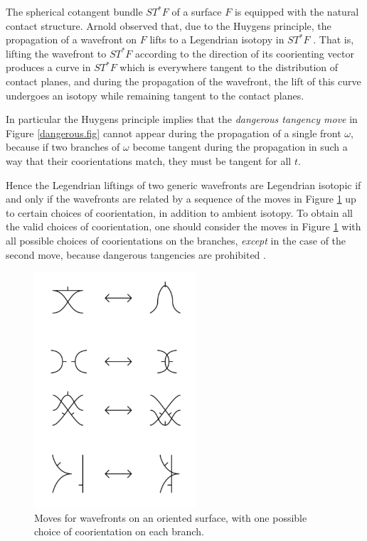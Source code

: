 The spherical cotangent bundle $ST^*F$ of a surface $F$ is equipped with the natural contact structure.  Arnold observed that, due to the Huygens principle, the propagation of a wavefront on $F$ lifts to a Legendrian isotopy in $ST^*F$ \cite{ArnoldMechanics, ArnoldPDE}.  That is, lifting the wavefront to $ST^*F$ according to the direction of its coorienting vector produces a curve in $ST^*F$ which is everywhere tangent to the distribution of contact planes, and during the propagation of the wavefront, the lift of this curve undergoes an isotopy while remaining tangent to the contact planes.  

In particular the Huygens principle implies that the {\it dangerous tangency move} in Figure \ref{dangerous.fig} cannot appear during the propagation of a single front $\omega$, because if two branches of $\omega$ become tangent during the propagation in such a way that their coorientations match, they must be tangent for all $t$.


Hence the Legendrian liftings of two generic wavefronts are Legendrian isotopic if and only if the wavefronts are related by a sequence of the moves in Figure \ref{wavefrontmoves.fig} up to certain choices of coorientation, in addition to ambient isotopy.  To obtain all the valid choices of coorientation, one should consider the moves in Figure \ref{wavefrontmoves.fig} with all possible choices of coorientations on the branches, {\it except} in the case of the second move, because dangerous tangencies are prohibited \cite{ArnoldInvariants}.



\begin{figure}[htbp]
	\centering
	\includegraphics[width=6cm]{wavefrontmoves}
	\caption{Moves for wavefronts on an oriented surface, with one possible choice of coorientation on each branch.}
	\label{wavefrontmoves.fig}
\end{figure}

